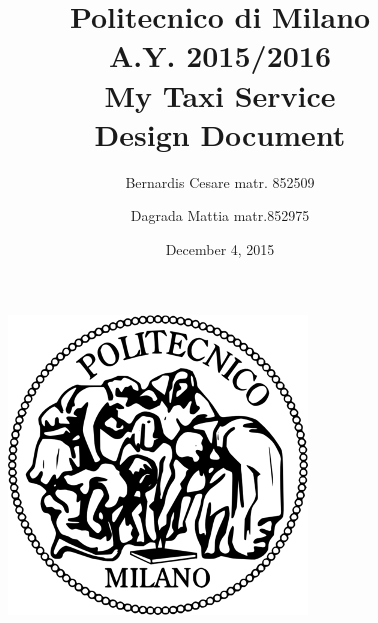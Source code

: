 \documentclass[11pt,a4paper,titlepage]{article}
\begin{document}
\begin{figure}
	\centering
	\includegraphics[scale=0.6]{../SE2_IMAGES/Logo_Politecnico_Milano}
\end{figure}
\title{Politecnico di Milano\\A.Y. 2015/2016\\\textbf{My Taxi Service}\\Design Document\\}
\author{Bernardis Cesare matr. 852509 \and Dagrada Mattia matr.852975}
\date{December 4, 2015}
\maketitle

\newpage

\tableofcontents

\newpage








\end{document}
